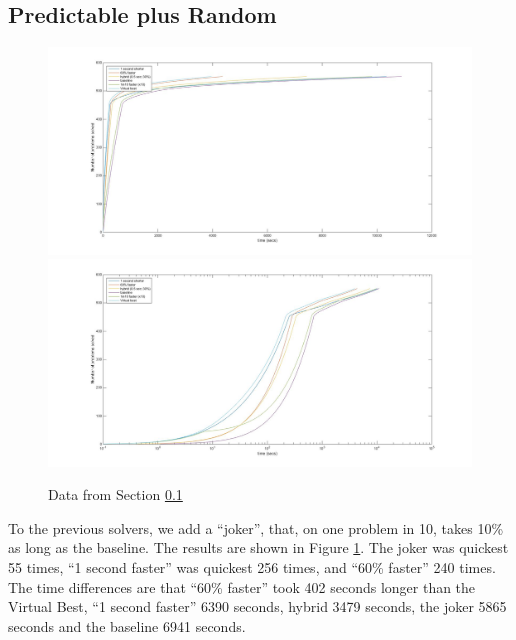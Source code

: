 \documentclass{article}
\begin{document}
\subsection{Predictable plus Random}\label{sec:P+J}
\begin{figure}[h]
\caption{Data from Section \ref{sec:P+J}\label{Fig:S4}}
\includegraphics[scale=0.25]{Fig4a.jpg}
\includegraphics[scale=0.25]{Fig4b.jpg}
\end{figure}
To the previous solvers, we add a ``joker'', that, on one problem in 10, takes 10\% as long as the baseline.  The results are shown in Figure \ref{Fig:S4}. The joker was quickest 55 times, ``1 second faster'' was quickest 256 times, and ``60\% faster'' 240 times. The time differences are that ``60\% faster'' took 402 seconds longer than the Virtual Best, ``1 second faster''  6390 seconds, hybrid 3479 seconds, the joker 5865 seconds and the baseline 6941 seconds.
\end{document}
